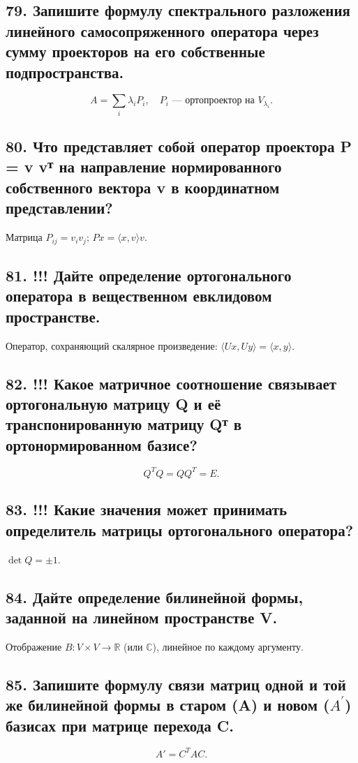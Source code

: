 \documentclass[a4paper,12pt]{article}
\begin{document}
\subsection*{79. Запишите формулу спектрального разложения линейного самосопряженного оператора через сумму проекторов на его собственные подпространства.}
\[ A = \sum_i \lambda_i P_i, \quad P_i \text{ — ортопроектор на } V_{\lambda_i}. \]

\subsection*{80. Что представляет собой оператор проектора P = v vᵀ на направление нормированного собственного вектора v в координатном представлении?}
Матрица \(P_{ij} = v_i v_j\); \(P x = \langle x, v \rangle v\).

\subsection*{81. !!! Дайте определение ортогонального оператора в вещественном евклидовом пространстве.}
Оператор, сохраняющий скалярное произведение: \(\langle Ux, Uy \rangle = \langle x, y \rangle\).

\subsection*{82. !!! Какое матричное соотношение связывает ортогональную матрицу Q и её транспонированную матрицу Qᵀ в ортонормированном базисе?}
\[ Q^T Q = Q Q^T = E. \]

\subsection*{83. !!! Какие значения может принимать определитель матрицы ортогонального оператора?}
\(\det Q = \pm 1\).

\subsection*{84. Дайте определение билинейной формы, заданной на линейном пространстве V.}
Отображение \(B: V \times V \to \mathbb{R}\) (или \(\mathbb{C}\)), линейное по каждому аргументу.

\subsection*{85. Запишите формулу связи матриц одной и той же билинейной формы в старом (A) и новом ($A^'$) базисах при матрице перехода C.}
\[ A' = C^T A C. \]
\end{document}
